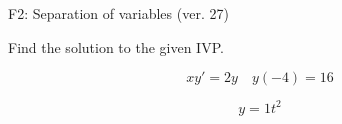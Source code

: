 \begin{exercise}
  \begin{exerciseTitle}F2: Separation of variables (ver. 27)\end{exerciseTitle}
  \begin{exerciseStatement}
    
Find the solution to the given IVP.

    
\[xy'= 2 y \hspace{1em} y( -4 ) = 16\]

  \end{exerciseStatement}
  \begin{exerciseAnswer}
    
\[y= 1 t^ 2\]

  \end{exerciseAnswer}
\end{exercise}